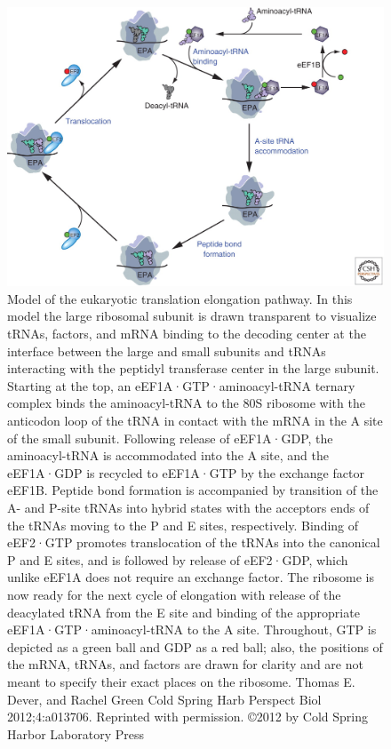 \documentclass[12pt,openany]{book}
\begin{document}
\begin{figure}
  \includegraphics{./figures/elongation.jpg}
  \caption{Model of the eukaryotic translation elongation pathway. In this model the large ribosomal subunit is drawn transparent to visualize tRNAs, factors, and mRNA binding to the decoding center at the interface between the large and small subunits and tRNAs interacting with the peptidyl transferase center in the large subunit. Starting at the top, an eEF1A·GTP·aminoacyl-tRNA ternary complex binds the aminoacyl-tRNA to the 80S ribosome with the anticodon loop of the tRNA in contact with the mRNA in the A site of the small subunit. Following release of eEF1A·GDP, the aminoacyl-tRNA is accommodated into the A site, and the eEF1A·GDP is recycled to eEF1A·GTP by the exchange factor eEF1B. Peptide bond formation is accompanied by transition of the A- and P-site tRNAs into hybrid states with the acceptors ends of the tRNAs moving to the P and E sites, respectively. Binding of eEF2·GTP promotes translocation of the tRNAs into the canonical P and E sites, and is followed by release of eEF2·GDP, which unlike eEF1A does not require an exchange factor. The ribosome is now ready for the next cycle of elongation with release of the deacylated tRNA from the E site and binding of the appropriate eEF1A·GTP·aminoacyl-tRNA to the A site. Throughout, GTP is depicted as a green ball and GDP as a red ball; also, the positions of the mRNA, tRNAs, and factors are drawn for clarity and are not meant to specify their exact places on the ribosome. Thomas E. Dever, and Rachel Green Cold Spring Harb Perspect Biol 2012;4:a013706. Reprinted with permission. ©2012 by Cold Spring Harbor Laboratory Press
 \label{fig:elongation}}
\end{figure}
\end{document}
